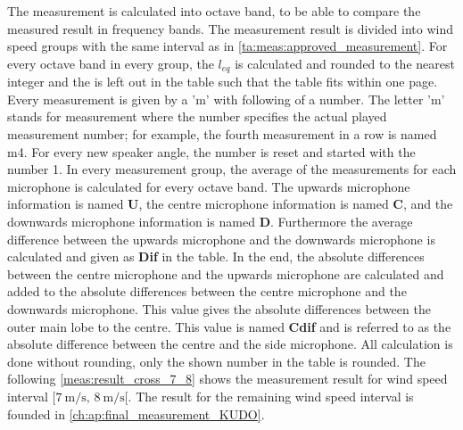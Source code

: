 The measurement is calculated into octave band, to be able to compare the measured result in frequency bands. The measurement result is divided into wind speed groups with the same interval as in \autoref{ta:meas:approved_measurement}. For every octave band in every group, the $l_{eq}$ is calculated and rounded to the nearest integer and the \db is left out in the table such that the table fits within one page. Every measurement is given by a 'm' with following of a number. The letter 'm' stands for measurement where the number specifies the actual played measurement number; for example, the fourth measurement in a row is named m4. For every new speaker angle, the number is reset and started with the number 1. In every measurement group, the average of the measurements for each microphone is calculated for every octave band. The upwards microphone information is named \textbf{U}, the centre microphone information is named \textbf{C}, and the downwards microphone information is named \textbf{D}. Furthermore the average difference between the upwards microphone and the downwards microphone is calculated and given as \textbf{Dif} in the table. In the end, the absolute differences between the centre microphone and the upwards microphone are calculated and added to the absolute differences between the centre microphone and the downwards microphone. This value gives the absolute differences between the outer main lobe to the centre. This value is named \textbf{Cdif} and is referred to as the absolute difference between the centre and the side microphone. All calculation is done without rounding, only the shown number in the table is rounded. The following \autoref{meas:result_cross_7_8} shows the measurement result for wind speed interval $[\SI{7}{\meter\per\second},\, \SI{8}{\meter\per\second}[ $. The result for the remaining wind speed interval is founded in \autoref{ch:ap:final_measurement_KUDO}.






